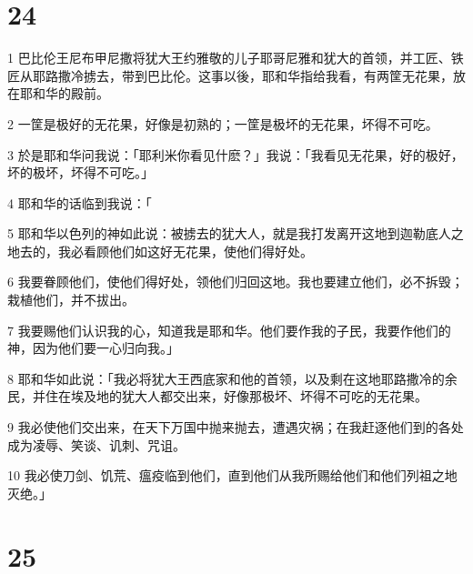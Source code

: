 \chapter{24}

\par 1 巴比伦王尼布甲尼撒将犹大王约雅敬的儿子耶哥尼雅和犹大的首领，并工匠、铁匠从耶路撒冷掳去，带到巴比伦。这事以後，耶和华指给我看，有两筐无花果，放在耶和华的殿前。
\par 2 一筐是极好的无花果，好像是初熟的；一筐是极坏的无花果，坏得不可吃。
\par 3 於是耶和华问我说：「耶利米你看见什麽？」我说：「我看见无花果，好的极好，坏的极坏，坏得不可吃。」
\par 4 耶和华的话临到我说：「
\par 5 耶和华以色列的神如此说：被掳去的犹大人，就是我打发离开这地到迦勒底人之地去的，我必看顾他们如这好无花果，使他们得好处。
\par 6 我要眷顾他们，使他们得好处，领他们归回这地。我也要建立他们，必不拆毁；栽植他们，并不拔出。
\par 7 我要赐他们认识我的心，知道我是耶和华。他们要作我的子民，我要作他们的神，因为他们要一心归向我。」
\par 8 耶和华如此说：「我必将犹大王西底家和他的首领，以及剩在这地耶路撒冷的余民，并住在埃及地的犹大人都交出来，好像那极坏、坏得不可吃的无花果。
\par 9 我必使他们交出来，在天下万国中抛来抛去，遭遇灾祸；在我赶逐他们到的各处成为凌辱、笑谈、讥刺、咒诅。
\par 10 我必使刀剑、饥荒、瘟疫临到他们，直到他们从我所赐给他们和他们列祖之地灭绝。」

\chapter{25}

